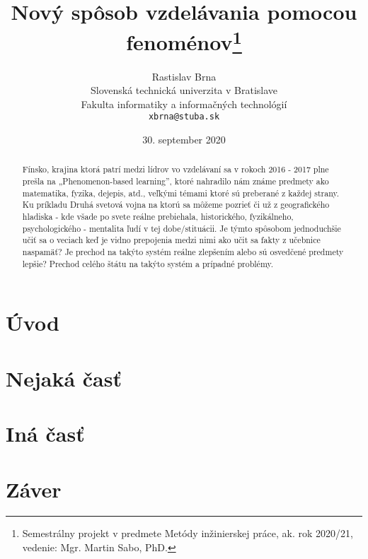 \documentclass[10pt,twoside,slovak,a4paper]{article}
\title{Nový spôsob vzdelávania pomocou fenoménov\thanks{Semestrálny projekt v predmete Metódy inžinierskej práce, ak. rok 2020/21, vedenie: Mgr. Martin Sabo, PhD.}} %
\author{Rastislav Brna\\[2pt]
	{\small Slovenská technická univerzita v Bratislave}\\
	{\small Fakulta informatiky a informačných technológií}\\
	{\small \texttt{xbrna@stuba.sk}}
	}
\date{\small 30. september 2020} %
\begin{document}
\maketitle

\begin{abstract}
	Fínsko, krajina ktorá patrí medzi lídrov vo vzdelávaní sa v rokoch 2016 - 2017 plne prešla na
	„Phenomenon-based learning”, ktoré nahradilo nám známe predmety ako matematika,
	fyzika, dejepis, atd., veľkými témami ktoré sú preberané z každej strany. Ku príkladu Druhá
	svetová vojna na ktorú sa môžeme pozrieť či už z geografického hladiska - kde všade po
	svete reálne prebiehala, historického, fyzikálneho, psychologického - mentalita ľudí v tej
	dobe/stituácii.  Je týmto spôsobom jednoduchšie učiť sa o veciach keď je vidno prepojenia
	medzi nimi ako učit sa fakty z učebnice naspamäť? Je prechod na takýto systém reálne
	zlepšením alebo sú osvedčené predmety lepšie? Prechod celého štátu na takýto systém a
	prípadné problémy.\cite{Coplien:MPD}\cite{Czarnecki:Progress}\cite{Czarnecki:Staged}\cite{Kang:FODA}\cite{PLP-Framework}
\end{abstract}



\section{Úvod}




\section{Nejaká časť} \label{nejaka}




\section{Iná časť} \label{ina}




\section{Záver} \label{zaver} %






\end{document}
